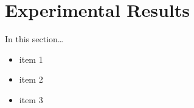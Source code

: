 \documentclass[../techreport.tex]{subfiles}
\begin{document}
\section{Experimental Results}
\label{sec:experiments}
In this section\ldots
\begin{itemize}
	\item item 1
	\item item 2
	\item item 3
\end{itemize}
\end{document}

